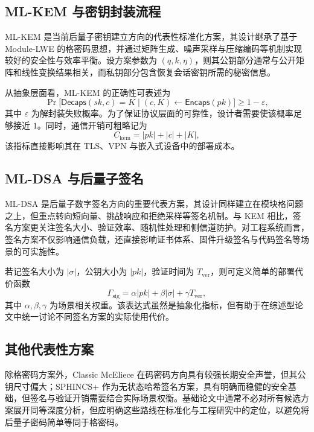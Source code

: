 ﻿\documentclass[12pt,a4paper]{ctexart}
\numberwithin{equation}{section}
\begin{document}
\subsection{ML-KEM 与密钥封装流程}
ML-KEM 是当前后量子密钥建立方向的代表性标准化方案，其设计继承了基于 Module-LWE 的格密码思想，并通过矩阵生成、噪声采样与压缩编码等机制实现较好的安全性与效率平衡。设方案参数为 $(q,k,\eta)$，则其公钥部分通常与公开矩阵和线性变换结果相关，而私钥部分包含恢复会话密钥所需的秘密信息。

从抽象层面看，ML-KEM 的正确性可表述为
\begin{equation}
    \Pr\bigl[\mathsf{Decaps}(sk,c)=K \mid (c,K)\leftarrow \mathsf{Encaps}(pk)\bigr] \ge 1-\varepsilon,
\end{equation}
其中 $\varepsilon$ 为解封装失败概率。为了保证协议层面的可靠性，设计者需要使该概率足够接近 $1$。同时，通信开销可粗略记为
\begin{equation}
    C_{\mathrm{kem}} = |pk| + |c| + |K|,
\end{equation}
该指标直接影响其在 TLS、VPN 与嵌入式设备中的部署成本。

\subsection{ML-DSA 与后量子签名}
ML-DSA 是后量子数字签名方向的重要代表方案，其设计同样建立在模块格问题之上，但重点转向短向量、挑战响应和拒绝采样等签名机制。与 KEM 相比，签名方案更关注签名大小、验证效率、随机性处理和侧信道防护。对工程系统而言，签名方案不仅影响通信负载，还直接影响证书体系、固件升级签名与代码签名等场景的可实施性。

若记签名大小为 $|\sigma|$，公钥大小为 $|pk|$，验证时间为 $T_{\mathrm{ver}}$，则可定义简单的部署代价函数
\begin{equation}
    \Gamma_{\mathrm{sig}} = \alpha |pk| + \beta |\sigma| + \gamma T_{\mathrm{ver}},
\end{equation}
其中 $\alpha,\beta,\gamma$ 为场景相关权重。该表达式虽然是抽象化指标，但有助于在综述型论文中统一讨论不同签名方案的实际使用代价。

\subsection{其他代表性方案}
除格密码方案外，Classic McEliece 在码密码方向具有较强长期安全声誉，但其公钥尺寸偏大；SPHINCS+ 作为无状态哈希签名方案，具有明确而稳健的安全基础，但签名与验证开销需要结合实际场景权衡。基础论文中通常不必对所有候选方案展开同等深度分析，但应明确这些路线在标准化与工程研究中的定位，以避免将后量子密码简单等同于格密码。
\end{document}
